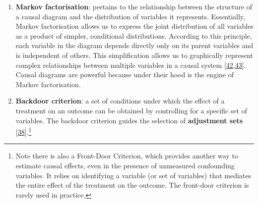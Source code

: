 \documentclass[
  singlecolumn]{article}
\begin{document}
\begin{enumerate}
\def\labelenumi{\arabic{enumi}.}
\setcounter{enumi}{9}
\item
  \textbf{Markov factorisation}: pertains to the relationship between
  the structure of a causal diagram and the distribution of variables it
  represents. Essentially, Markov factorisation allows us to express the
  joint distribution of all variables as a product of simpler,
  conditional distributions. According to this principle, each variable
  in the diagram depends directly only on its parent variables and is
  independent of others. This simplification allows us to graphically
  represent complex relationships between multiple variables in a causal
  system
  {[}\protect\hyperlink{ref-lauritzen1990}{42},\protect\hyperlink{ref-pearl1988}{43}{]}.
  Causal diagrams are powerful because under their hood is the engine of
  Markov factorisation.
\item
  \textbf{Backdoor criterion}: a set of conditions under which the
  effect of a treatment on an outcome can be obtained by controlling for
  a specific set of variables. The backdoor criterion guides the
  selection of \textbf{adjustment sets}
  {[}\protect\hyperlink{ref-pearl1995}{38}{]}.\footnote{Note there is
    also a Front-Door Criterion, which provides another way to estimate
    causal effects, even in the presence of unmeasured confounding
    variables. It relies on identifying a variable (or set of variables)
    that mediates the entire effect of the treatment on the outcome. The
    front-door criterion is rarely used in practice.}
\end{enumerate}
\end{document}
